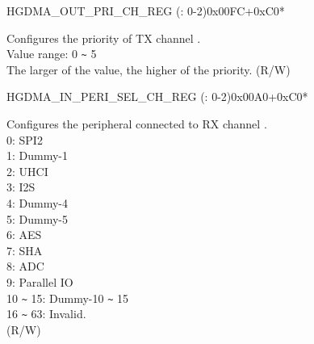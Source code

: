 \begin{register}{H}{GDMA\_OUT\_PRI\_CH\_REG (: 0-2)}{0x00FC+0xC0*}\label{regdesc:GDMAOUTPRICHNREG}
%
%
\regnewline%
\begin{regdesc}\begin{reglist}
\label{fielddesc:GDMATXPRICHN}\item [GDMA\_TX\_PRI\_CH\regindex{n}] Configures the priority of TX channel .\\
Value range: 0 \verb+~+ 5\\
The larger of the value, the higher of the priority. (R/W)
\end{reglist}\end{regdesc}
\end{register}


\begin{register}{H}{GDMA\_IN\_PERI\_SEL\_CH\_REG (: 0-2)}{0x00A0+0xC0*}\label{regdesc:GDMAINPERISELCHNREG}
%
%
\regnewline%
\begin{regdesc}\begin{reglist}
\label{fielddesc:GDMAPERIINSELCHN}\item [GDMA\_PERI\_IN\_SEL\_CH\regindex{n}] Configures the peripheral connected to RX channel .\\
0: SPI2\\
1: Dummy-1\\
2: UHCI\\
3: I2S\\
4: Dummy-4\\
5: Dummy-5\\
6: AES\\
7: SHA\\
8: ADC\\
9: Parallel IO\\
10 \verb+~+ 15: Dummy-10  \verb+~+  15\\
16 \verb+~+ 63: Invalid.\\
(R/W)

\end{reglist}\end{regdesc}
\end{register}


